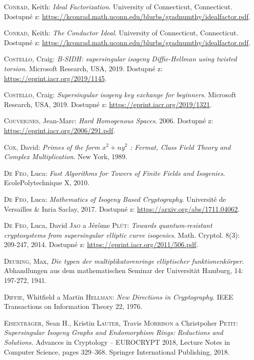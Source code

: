 \documentclass[12pt]{report}
\begin{document}
\begin{thebibliography}{97}
\textsc{Conrad}, Keith: \textit{Ideal Factorization}. University of Connecticut, Connecticut. Dostupné z: \url{https://kconrad.math.uconn.edu/blurbs/gradnumthy/idealfactor.pdf}.

\textsc{Conrad}, Keith: \textit{The Conductor Ideal}. University of Connecticut, Connecticut. Dostupné z: \url{https://kconrad.math.uconn.edu/blurbs/gradnumthy/idealfactor.pdf}.

\textsc{Costello}, Craig: \textit{B-SIDH: supersingular isogeny Diffie-Hellman using twisted torsion}. Microsoft Research, USA, 2019. Dostupné z: \url{https://eprint.iacr.org/2019/1145}.

\textsc{Costello}, Craig: \textit{Supersingular isogeny key exchange for beginners}. Microsoft Research, USA, 2019. Dostupné z: \url{https://eprint.iacr.org/2019/1321}.


\textsc{Couveignes}, Jean-Marc: \textit{Hard Homogenous Spaces}. 2006. Dostupné z: \url{https://eprint.iacr.org/2006/291.pdf}.

\textsc{Cox}, David: \textit{Primes of the form $x^2+n y^2$ : Fermat, Class Field Theory and Complex Multiplication}. New York, 1989.

\textsc{De Feo}, Luca: \textit{Fast Algorithms for Towers of Finite Fields and Isogenies}. EcolePolytechnique X, 2010. 

\textsc{De Feo}, Luca: \textit{Mathematics of Isogeny Based Cryptography}. Université de Versailles \& Inria Saclay, 2017. Dostupné z: \url{https://arxiv.org/abs/1711.04062}.

\textsc{De Feo}, Luca, David \textsc{Jao} a Jérôme \textsc{Plût}: \textit{Towards quantum-resistant cryptosystems from supersingular elliptic curve isogenies}. Math. Cryptol. 8(3): 209-247, 2014. Dostupné z: \url{https://eprint.iacr.org/2011/506.pdf}.

\textsc{Deuring}, Max, \textit{Die typen der multiplikatorenringe elliptischer funktionenkörper}. Abhandlungen aus dem mathematischen Seminar der Universität Hamburg, 14: 197-272, 1941. 

\textsc{Diffie}, Whitfield a Martin \textsc{Hellman}: \textit{New Directions in Cryptography}. IEEE Transactions on Information Theory 22, 1976.

\textsc{Eisentr{\"a}ger}, Sean H., Kristin \textsc{Lauter}, Travis \textsc{Morrison} a Christpoher \textsc{Petit}: \textit{Supersingular Isogeny Graphs and Endomorphism Rings: Reductions and Solutions.}
Advances in Cryptology – EUROCRYPT 2018, Lecture Notes in Computer Science, pages 329–368. Springer International Publishing, 2018.


\end{thebibliography}
\end{document}
